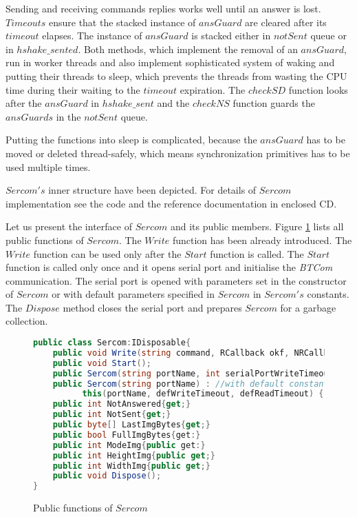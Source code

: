 	Sending and receiving commands replies works well 
	until an answer is lost. $Timeouts$ ensure that the stacked instance of $ansGuard$ are cleared after its $timeout$  elapses.
	The instance of $ansGuard$ is stacked either in $notSent$ queue	or in $hshake\_sented$.
	Both methods, which implement the removal of an $ansGuard$, run in worker threads and also implement
	sophisticated system of waking and putting their threads to sleep, which prevents the threads from wasting
	the CPU time during their waiting to the $timeout$ expiration. 
	The $checkSD$ function looks after the $ansGuard$ in $hshake\_sent$ and the $checkNS$ function guards
	the $ansGuards$ in the $notSent$ queue.

	Putting the functions into sleep is complicated, because the $ansGuard$ has to be moved or deleted thread-safely,
	which means synchronization primitives has to be used multiple times.
	
	
	$Sercom's$ inner structure have been depicted. For details of 
	$Sercom$ implementation see the code and the reference documentation in enclosed CD.

	Let  us present the interface of $Sercom$ and its public members.
	Figure \ref{publicser} lists all public functions of $Sercom$.
	The $Write$ function has been already introduced. The $Write$ function can be used only
	after the $Start$ function is called. The $Start$ function is called only once and
	it opens serial port and initialise the {\it BTCom} communication. 
	The serial port is opened with parameters set in the constructor of $Sercom$ or with
	default parameters specified in $Sercom$ in $Sercom's$ constants. The $Dispose$ method closes the serial port
	and prepares $Sercom$ for a garbage collection.

\begin{figure}[!hbp]
\begin{lstlisting}[language=cs]
public class Sercom:IDisposable{
	public void Write(string command, RCallback okf, NRCallback kof,object state, double timeout);
	public void Start();
	public Sercom(string portName, int serialPortWriteTimeout, int serialPortReadTimeout);
	public Sercom(string portName) : //with default constants
	      this(portName, defWriteTimeout, defReadTimeout) { }
	public int NotAnswered{get;}
	public int NotSent{get;}
	public byte[] LastImgBytes{get;}
	public bool FullImgBytes{get:}
	public int ModeImg{public get:}
	public int HeightImg{public get;}
	public int WidthImg{public get;}
	public void Dispose();
}
\end{lstlisting}
\caption{Public functions of $Sercom$} \label{publicser}	
\end{figure}

